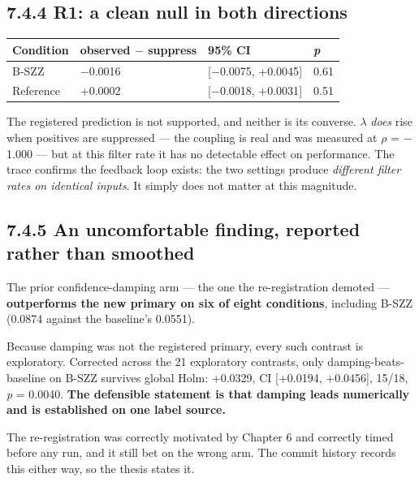 \subsection{7.4.4 R1: a clean null in both
directions}\label{r1-a-clean-null-in-both-directions}

\begin{longtable}[]{@{}llll@{}}
\toprule\noalign{}
Condition & observed \ensuremath{-} suppress & 95\% CI & \emph{p} \\
\midrule\noalign{}
\endhead
\bottomrule\noalign{}
\endlastfoot
B-SZZ & \ensuremath{-}0.0016 & {[}\ensuremath{-}0.0075, +0.0045{]} & 0.61 \\
Reference & +0.0002 & {[}\ensuremath{-}0.0018, +0.0031{]} & 0.51 \\
\end{longtable}

The registered prediction is not supported, and neither is its converse.
\ensuremath{\lambda} \emph{does} rise when positives are suppressed --- the coupling is
real and was measured at \ensuremath{\rho} = \ensuremath{-}1.000 --- but at this filter rate it has
no detectable effect on performance. The trace confirms the feedback
loop exists: the two settings produce \emph{different filter rates on
identical inputs}. It simply does not matter at this magnitude.

\subsection{7.4.5 An uncomfortable finding, reported rather than
smoothed}\label{an-uncomfortable-finding-reported-rather-than-smoothed}

The prior confidence-damping arm --- the one the re-registration demoted
--- \textbf{outperforms the new primary on six of eight conditions},
including B-SZZ (0.0874 against the baseline's 0.0551).

Because damping was not the registered primary, every such contrast is
exploratory. Corrected across the 21 exploratory contrasts, only
damping-beats-baseline on B-SZZ survives global Holm: +0.0329, CI
{[}+0.0194, +0.0456{]}, 15/18, \emph{p} = 0.0040. \textbf{The defensible
statement is that damping leads numerically and is established on one
label source.}

The re-registration was correctly motivated by Chapter 6 and correctly
timed before any run, and it still bet on the wrong arm. The commit
history records this either way, so the thesis states it.

